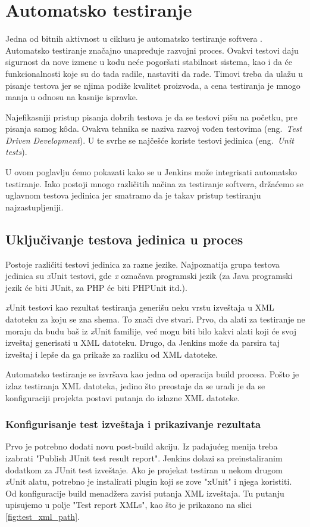 \section{Automatsko testiranje}
Jedna od bitnih aktivnost u ciklusu je automatsko testiranje softvera \cite{jenkins:2011}. Automatsko testiranje značajno unapređuje razvojni proces. Ovakvi testovi daju sigurnost da nove izmene u kodu neće pogoršati stabilnost sistema, kao i da će funkcionalnosti koje su do tada radile, nastaviti da rade. Timovi treba da ulažu u pisanje testova jer se njima podiže kvalitet proizvoda, a cena testiranja je mnogo manja u odnosu na kasnije ispravke. 

Najefikasniji pristup pisanja dobrih testova je da se testovi pišu na početku, pre pisanja samog k\^oda. Ovakva tehnika se naziva razvoj vođen testovima (eng.~{\em Test Driven Development}). U te svrhe se najčešće koriste testovi jedinica (eng.~{\em Unit tests}). 

U ovom poglavlju ćemo pokazati kako se u Jenkins može integrisati automatsko testiranje. Iako postoji mnogo različitih načina za testiranje softvera, držaćemo se uglavnom testova jedinica jer smatramo da je takav pristup testiranju najzastupljeniji.

\subsection{Uključivanje testova jedinica u proces}
Postoje različiti testovi jedinica za razne jezike. Najpoznatija grupa testova jedinica su \textit{x}Unit testovi, gde \textit{x} označava programski jezik (za Java programski jezik će biti JUnit, za PHP će biti PHPUnit itd.). 

\textit{x}Unit testovi kao rezultat testiranja generišu neku vrstu izveštaja u XML datoteku za koju se zna shema. To znači dve stvari. Prvo, da alati za testiranje ne moraju da budu baš iz \textit{x}Unit familije, već mogu biti bilo kakvi alati koji će svoj izveštaj generisati u XML datoteku. Drugo, da Jenkins može da parsira taj izveštaj i lepše da ga prikaže za razliku od XML datoteke.

Automatsko testiranje se izvršava kao jedna od operacija build procesa. Pošto je izlaz testiranja XML datoteka, jedino što preostaje da se uradi je da se konfiguraciji projekta postavi putanja do izlazne XML datoteke.

\subsubsection{Konfigurisanje test izveštaja i prikazivanje rezultata}
Prvo je potrebno dodati novu post-build akciju. Iz padajućeg menija treba izabrati "Publish JUnit test result report". Jenkins dolazi sa preinstaliranim dodatkom za JUnit test izveštaje. Ako je projekat testiran u nekom drugom \textit{x}Unit alatu, potrebno je instalirati plugin koji se zove "xUnit" i njega koristiti. Od konfiguracije build menadžera zavisi putanja XML izveštaja. Tu putanju upisujemo u polje "Test report XMLs", kao što je prikazano na slici \ref{fig:test_xml_path}. 

